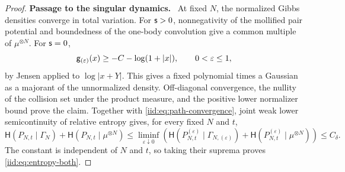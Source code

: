 \documentclass[11pt,reqno]{amsart}
\numberwithin{equation}{section}
\theoremstyle{plain}
\theoremstyle{remark}
\newcommand{\Hr}{\mathsf H}\newcommand{\dd}{\,\mathrm d}
\newcommand{\parheading}[1]{\par\medskip\noindent\textbf{#1}\ }
\begin{document}
\begin{proof}
\parheading{Passage to the singular dynamics.}
At fixed $N$, the normalized Gibbs densities converge in total variation. For $\mathsf{s}>0$, nonnegativity of the mollified pair potential and boundedness of the one-body convolution give a common multiple of $\mu^{\otimes N}$. For $\mathsf{s}=0$,
\begin{equation}\label{iid:eq:log-majorant}
 \mathsf g_{(\varepsilon)}(x)\ge-C-\log(1+|x|),\qquad 0<\varepsilon\le1,
\end{equation}
by Jensen applied to $\log|x+Y|$. This gives a fixed polynomial times a Gaussian as a majorant of the unnormalized density. Off-diagonal convergence, the nullity of the collision set under the product measure, and the positive lower normalizer bound prove the claim. Together with \eqref{iid:eq:path-convergence}, joint weak lower semicontinuity of relative entropy \cite[Theorem~19]{vanErvenHarremoes2014} gives, for every fixed $N$ and $t$,
\begin{equation}\label{iid:eq:singular-entropy-transfer}
 \Hr(P_{N,t}\mid\Gamma_N)+\Hr(P_{N,t}\mid\mu^{\otimes N})
 \le\liminf_{\varepsilon\downarrow0}
 \left(\Hr(P_{N,t}^{(\varepsilon)}\mid\Gamma_{N,(\varepsilon)})
 +\Hr(P_{N,t}^{(\varepsilon)}\mid\mu^{\otimes N})\right)\le C_\delta.
\end{equation}
The constant is independent of $N$ and $t$, so taking their suprema proves \eqref{iid:eq:entropy-both}.
\end{proof}
\end{document}
